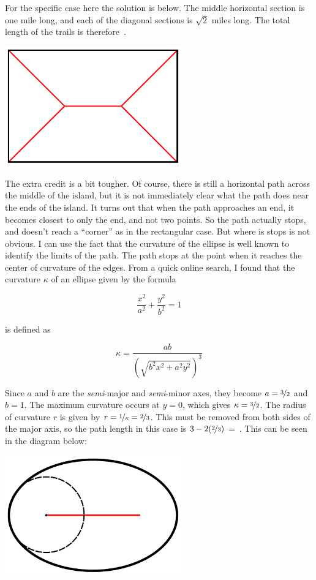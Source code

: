\documentclass{article}
\begin{document}
For the specific case here the solution is below.
The middle horizontal section is one mile long, and each of the diagonal sections is $\sqrt{2}$ miles long.
The total length of the trails is therefore
\,.

\vspace{0.1in}
\begin{center}
\includegraphics[width=3in]{rectangle_path}
\end{center}
\vspace{0.1in}

The extra credit is a bit tougher.
Of course, there is still a horizontal path across the middle of the island, but it is not immediately clear what the path does near the ends of the island.
It turns out that when the path approaches an end, it becomes closest to only the end, and not two points.
So the path actually stops, and doesn't reach a ``corner'' as in the rectangular case.
But where is stops is not obvious.
I can use the fact that the curvature of the ellipse is well known to identify the limits of the path.
The path stops at the point when it reaches the center of curvature of the edges.
From a quick online search, I found that the curvature $\kappa$ of an ellipse given by the formula

\[
\frac{x^{2}}{a^{2}}+\frac{y^{2}}{b^{2}}=1
\]

is defined as

\[
\kappa=\frac{ab}{\left(\sqrt{b^{2}x^{2}+a^{2}y^{2}}\right)^3}
\]

Since $a$ and $b$ are the \textit{semi}-major and \textit{semi}-minor axes, they become $a=\nicefrac{3}{2}$ and $b=1$.
The maximum curvature occurs at $y=0$, which gives $\kappa=\nicefrac{3}{2}$.
The radius of curvature $r$ is given by $r=\nicefrac{1}{\kappa}=\nicefrac{2}{3}$.
This must be removed from both sides of the major axis, so the path length in this case is $3-2(\nicefrac{2}{3})$ =
\,.
This can be seen in the diagram below:

\vspace{0.1in}
\begin{center}
\includegraphics[width=3in]{ellipse_path}
\end{center}
\end{document}
